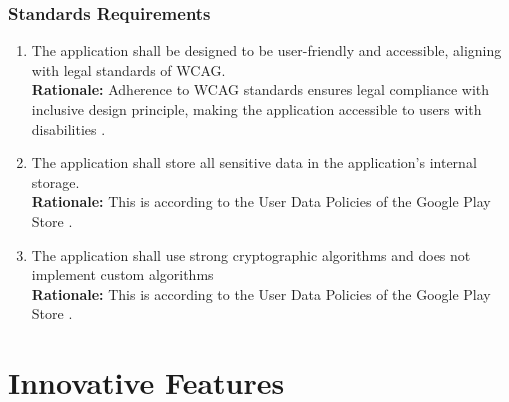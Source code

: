 \documentclass[]{article}
\begin{document}
\subsubsection{Standards Requirements}
\label{ssub:standards_requirements}
\begin{enumerate}[{LR-STD}1. ]
	\item The application shall be designed to be user-friendly and accessible, aligning with legal standards of WCAG. \\
	      {\bf Rationale:} Adherence to WCAG standards ensures legal compliance with inclusive design principle, making the application accessible to users with disabilities
	      \cite{2c}.
	\item The application shall store all sensitive data in the application's internal storage. \\
	      {\bf Rationale:} This is according to the User Data Policies of the Google Play Store
	      \cite{11c}.
	\item The application shall use strong cryptographic algorithms and does not implement custom algorithms \\
	      {\bf Rationale:} This is according to the User Data Policies of the Google Play Store
	      \cite{11c}.
\end{enumerate}



\section{Innovative Features}
\label{sec:innovative_features}
\end{document}
